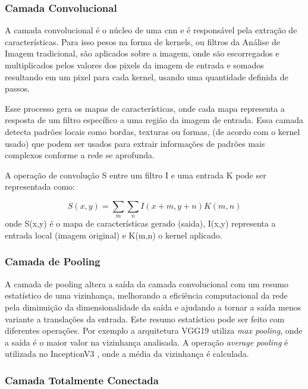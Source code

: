 \subsubsection{Camada Convolucional}

A camada convolucional é o núcleo de uma \acrshort{cnn} e é responsável pela extração de características. 
Para isso pesos na forma de kernels, ou filtros da Análise de Imagem tradicional, 
são aplicados sobre a imagem, onde são escorregados e multiplicados pelos valores dos pixels da imagem de entrada e somados resultando em um pixel para cada kernel, 
usando uma quantidade definida de passos. 

Esse processo gera os mapas de características, onde cada mapa representa a resposta de um filtro específico a uma região da imagem de entrada. 
Essa camada detecta padrões locais como bordas, texturas ou formas, (de acordo com o kernel usado) que podem ser usados para extrair informações de padrões mais complexos conforme a rede se aprofunda.

A operação de convolução S entre um filtro I e uma entrada K pode ser representada como:

\begin{equation}
    \label{eqn:convolution}
    S(x,y) = \sum_{m}\sum_{n}I(x+m,y+n)K(m,n)
\end{equation}
onde S(x,y) é o mapa de características gerado (saida), I(x,y) representa a entrada local (imagem original) e K(m,n) o kernel aplicado.
\subsubsection{Camada de Pooling}

A camada de pooling altera a saída da camada convolucional com um resumo estatístico de uma vizinhança, melhorando a eficiência computacional da rede pela diminuição da dimensionalidade da saída e ajudando a tornar a saída menos variante a translações da entrada.
Este resumo estatístico pode ser feito com diferentes operações. Por exemplo a arquitetura VGG19 \cite{vgg} utiliza \textit{max pooling}, onde a saída é o maior valor na vizinhança analisada. A operação \textit{average pooling} é utilizada no InceptionV3 \cite{inceptionv3}, onde a média da vizinhança é calculada.


\subsubsection{Camada Totalmente Conectada}

